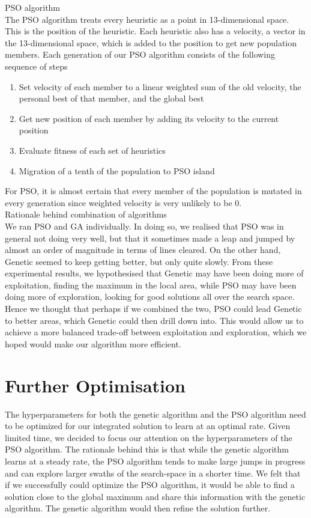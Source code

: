 \documentclass{article}
\begin{document}
	PSO algorithm\\
	The PSO algorithm treats every heuristic as a point in 13-dimensional space.
	This is the position of the heuristic. Each heuristic also has a velocity,
	a vector in the 13-dimensional space, which is added to the position to get
	new population members.
	Each generation of our PSO algorithm consists of the following sequence of steps
	\begin{enumerate}
		\item Set velocity of each member to a linear weighted sum of the old velocity,
		the personal best of that member, and the global best
		\item Get new position of each member by adding its velocity to the current
		position
		\item Evaluate fitness of each set of heuristics
		\item Migration of a tenth of the population to PSO island
	\end{enumerate}
	For PSO, it is almost certain that every member of the population is mutated
	in every generation since weighted velocity is very unlikely to be 0.\\

	Rationale behind combination of algorithms\\
	We ran PSO and GA individually. In doing so, we realised that PSO was in general not doing
	very well, but that it sometimes made a leap and jumped by almost an order of magnitude
	in terms of lines cleared. On the other hand, Genetic seemed to keep getting
	better, but only quite slowly. From these experimental results, we hypothesised
	that Genetic may have been doing more of exploitation, finding the maximum in the local area,
	while PSO may have been doing more of exploration, looking for good solutions all over
	the search space. Hence we thought that perhaps if we combined the two,
	PSO could lead Genetic to better areas, which Genetic could then drill down into.
	This would allow us to achieve a more balanced trade-off between exploitation
	and exploration, which we hoped would make our algorithm more efficient.

	\section{Further Optimisation}
	The hyperparameters for both the genetic algorithm and the PSO algorithm need
	to be optimized for our integrated solution to learn at an optimal rate.
	Given limited time, we decided to focus our attention on the hyperparameters
	of the PSO algorithm. The rationale behind this is that while the genetic
	algorithm learns at a steady rate, the PSO algorithm tends to make large jumps
	in progress and can explore larger swaths of the search-space in a shorter
	time. We felt that if we successfully could optimize the PSO algorithm, it would be able to
	find a solution close to the global maximum and share this information with the genetic algorithm.
	The genetic algorithm would then refine the solution further.
\end{document}
